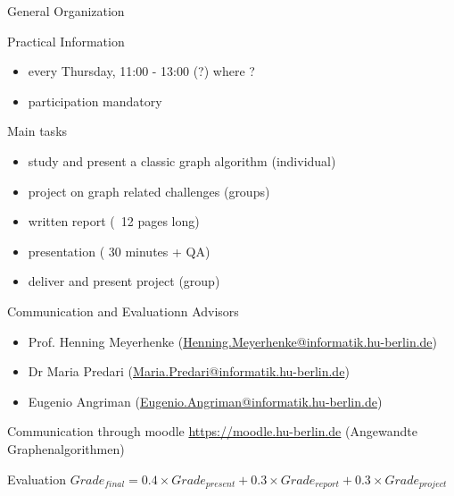 \documentclass[titlepage,german,presentation]{beamer}
\begin{document}
\begin{frame}{General Organization}

  Practical Information
  \begin{itemize}
  \item every Thursday, 11:00 - 13:00 (?) where ?
  \item participation mandatory
  \end{itemize}
  Main tasks
  \begin{itemize}
  \item study and present a classic graph algorithm (individual)
  \item project on graph related challenges (groups)
  \item written report (~12 pages long)
  \item presentation ( 30 minutes + QA)
  \item deliver and present project (group)  
\end{itemize}
\end{frame}

\begin{frame}{Communication and Evaluationn}
  Advisors
  \begin{itemize}
  \item Prof. Henning Meyerhenke (\url{Henning.Meyerhenke@informatik.hu-berlin.de})
  \item Dr Maria Predari (\url{Maria.Predari@informatik.hu-berlin.de})
  \item Eugenio Angriman (\url{Eugenio.Angriman@informatik.hu-berlin.de})
\end{itemize}
  Communication through moodle \url{https://moodle.hu-berlin.de} (Angewandte Graphenalgorithmen)

  \begin{block}{Evaluation}
  $Grade_{final} = 0.4 \times Grade_{present} + 0.3 \times Grade_{report} + 0.3 \times Grade_{project}$
  \end{block}
\end{frame}
\end{document}
